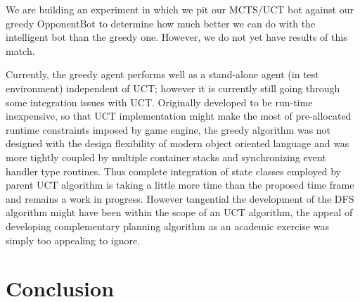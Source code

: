 \documentclass[a4paper,11pt]{article}
\begin{document}
We are building an experiment in which we pit our MCTS/UCT bot against our greedy OpponentBot to determine how much better we can do with the intelligent bot than the greedy one.  However, we do not yet have results of this match.

Currently, the greedy agent performs well as a stand-alone agent (in test environment) independent of UCT; however it is currently still going through some integration issues with UCT. Originally developed to be run-time inexpensive, so that UCT implementation might make the most of pre-allocated runtime constraints imposed by game engine, the greedy algorithm was not designed with the design flexibility of modern object oriented language and was more tightly coupled by multiple container stacks and synchronizing event handler type routines. Thus complete integration of state classes employed by parent UCT algorithm is taking a little more time than the proposed time frame and remains a work in progress. However tangential the development of the DFS algorithm might have been within the scope of an UCT algorithm, the appeal of developing complementary planning algorithm as an academic exercise was simply too appealing to ignore.

\section{Conclusion}\label{sec:conclusion}



\end{document}
